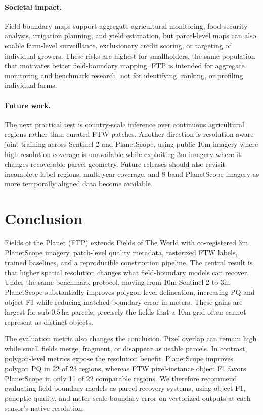 \documentclass[10pt,twocolumn,letterpaper]{article}
\begin{document}
\paragraph{Societal impact.}
Field-boundary maps support aggregate agricultural monitoring, food-security analysis, irrigation planning, and yield estimation, but parcel-level maps can also enable farm-level surveillance, exclusionary credit scoring, or targeting of individual growers. These risks are highest for smallholders, the same population that motivates better field-boundary mapping. FTP is intended for aggregate monitoring and benchmark research, not for identifying, ranking, or profiling individual farms.

\paragraph{Future work.}
The next practical test is country-scale inference over continuous agricultural regions rather than curated FTW patches. Another direction is resolution-aware joint training across Sentinel-2 and PlanetScope, using public 10m imagery where high-resolution coverage is unavailable while exploiting 3m imagery where it changes recoverable parcel geometry. Future releases should also revisit incomplete-label regions, multi-year coverage, and 8-band PlanetScope imagery as more temporally aligned data become available.

\section{Conclusion}

Fields of the Planet (FTP) extends Fields of The World with co-registered 3m PlanetScope imagery, patch-level quality metadata, rasterized FTW labels, trained baselines, and a reproducible construction pipeline. The central result is that higher spatial resolution changes what field-boundary models can recover. Under the same benchmark protocol, moving from 10m Sentinel-2 to 3m PlanetScope substantially improves polygon-level delineation, increasing PQ and object F1 while reducing matched-boundary error in meters. These gains are largest for sub-$0.5$\,ha parcels, precisely the fields that a 10m grid often cannot represent as distinct objects.

The evaluation metric also changes the conclusion. Pixel overlap can remain high while small fields merge, fragment, or disappear as usable parcels. In contrast, polygon-level metrics expose the resolution benefit. PlanetScope improves polygon PQ in 22 of 23 regions, whereas FTW pixel-instance object F1 favors PlanetScope in only 11 of 22 comparable regions. We therefore recommend evaluating field-boundary models as parcel-recovery systems, using object F1, panoptic quality, and meter-scale boundary error on vectorized outputs at each sensor's native resolution.


{\small


}
\end{document}
